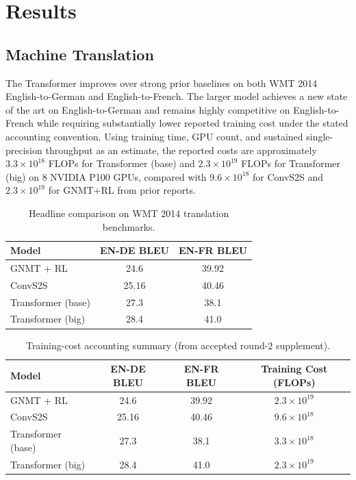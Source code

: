 \section{Results}

\subsection{Machine Translation}

The Transformer improves over strong prior baselines on both WMT 2014 English-to-German and English-to-French. The larger model achieves a new state of the art on English-to-German and remains highly competitive on English-to-French while requiring substantially lower reported training cost under the stated accounting convention. Using training time, GPU count, and sustained single-precision throughput as an estimate, the reported costs are approximately $3.3\times 10^{18}$ FLOPs for Transformer (base) and $2.3\times 10^{19}$ FLOPs for Transformer (big) on 8 NVIDIA P100 GPUs, compared with $9.6\times 10^{18}$ for ConvS2S and $2.3\times 10^{19}$ for GNMT+RL from prior reports.

\begin{table}[h]
\centering
\caption{Headline comparison on WMT 2014 translation benchmarks.}
\label{tab:headline-results}
\begin{tabular}{lcc}
\toprule
Model & EN-DE BLEU & EN-FR BLEU \\
\midrule
GNMT + RL & 24.6 & 39.92 \\
ConvS2S & 25.16 & 40.46 \\
Transformer (base) & 27.3 & 38.1 \\
Transformer (big) & 28.4 & 41.0 \\
\bottomrule
\end{tabular}
\end{table}

\begin{table}[h]
\centering
\caption{Training-cost accounting summary (from accepted round-2 supplement).}
\label{tab:cost-accounting}
\begin{tabular}{lccc}
\toprule
Model & EN-DE BLEU & EN-FR BLEU & Training Cost (FLOPs) \\
\midrule
GNMT + RL & 24.6 & 39.92 & $2.3\times 10^{19}$ \\
ConvS2S & 25.16 & 40.46 & $9.6\times 10^{18}$ \\
Transformer (base) & 27.3 & 38.1 & $3.3\times 10^{18}$ \\
Transformer (big) & 28.4 & 41.0 & $2.3\times 10^{19}$ \\
\bottomrule
\end{tabular}
\end{table}

